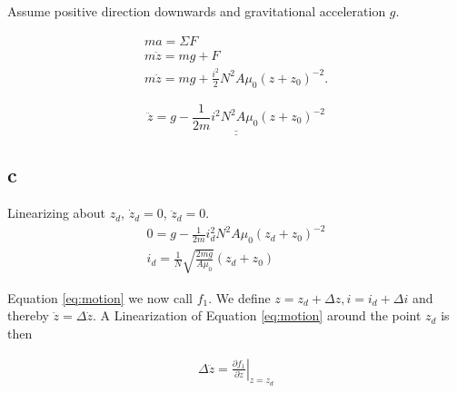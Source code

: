 \documentclass{article}
\begin{document}
Assume positive direction downwards and gravitational acceleration $g$.

\begin{align*}
	ma = \Sigma F\\
	m\ddot z = mg + F\\
	m\ddot z = mg + \frac{i^2}{2}N^2A\mu_0(z + z_0)^{-2}.
\end{align*}

\begin{equation}\label{eq:motion}
	\underline{\underline{\ddot z = g - \frac{1}{2m}i^2N^2A\mu_0(z+z_0)^{-2}}}
\end{equation}


\subsection{c}
Linearizing about $z_d$, $\dot z_d = 0$, $\ddot z_d = 0$.
\begin{align*}
	0 = g - \frac{1}{2m}i_d^2N^2A\mu_0(z_d+z_0)^{-2}\\
	i_d = \frac{1}{N}\sqrt{\frac{2mg}{A\mu_0}}(z_d + z_0)
\end{align*}

Equation \ref{eq:motion} we now call $f_1$. We define $z = z_d + \Delta z, i = i_d + \Delta i$ and thereby $\dot z = \Delta\dot z$. A Linearization of Equation \ref{eq:motion} around the point $z_d$ is then

\begin{align}
	\Delta\ddot z = \left. \frac{\partial f_1}{\partial \dot z} \right|_{z = z_d}
\end{align}
\end{document}
